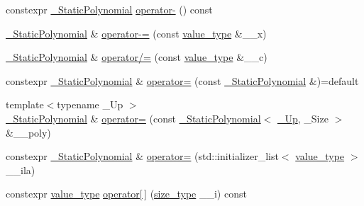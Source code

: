 \begin{DoxyCompactItemize}
\item 
constexpr \hyperlink{class____gnu__cxx_1_1__StaticPolynomial}{\+\_\+\+Static\+Polynomial} \hyperlink{class____gnu__cxx_1_1__StaticPolynomial_af5840c98a6a2a89c4e1220e03e68e6ba}{operator-\/} () const
\item 
\hyperlink{class____gnu__cxx_1_1__StaticPolynomial}{\+\_\+\+Static\+Polynomial} \& \hyperlink{class____gnu__cxx_1_1__StaticPolynomial_a8eef582763ba8d005a66d0ebc90a0312}{operator-\/=} (const \hyperlink{class____gnu__cxx_1_1__StaticPolynomial_aad5f3d6d5876b6926b30724aeac649d6}{value\+\_\+type} \&\+\_\+\+\_\+x)
\item 
\hyperlink{class____gnu__cxx_1_1__StaticPolynomial}{\+\_\+\+Static\+Polynomial} \& \hyperlink{class____gnu__cxx_1_1__StaticPolynomial_a33ab57b78b20dc2c752241c08109c360}{operator/=} (const \hyperlink{class____gnu__cxx_1_1__StaticPolynomial_aad5f3d6d5876b6926b30724aeac649d6}{value\+\_\+type} \&\+\_\+\+\_\+c)
\item 
constexpr \hyperlink{class____gnu__cxx_1_1__StaticPolynomial}{\+\_\+\+Static\+Polynomial} \& \hyperlink{class____gnu__cxx_1_1__StaticPolynomial_ae494f0196ebbf520a47153f3ba53a315}{operator=} (const \hyperlink{class____gnu__cxx_1_1__StaticPolynomial}{\+\_\+\+Static\+Polynomial} \&)=default
\item 
{\footnotesize template$<$typename \+\_\+\+Up $>$ }\\\hyperlink{class____gnu__cxx_1_1__StaticPolynomial}{\+\_\+\+Static\+Polynomial} \& \hyperlink{class____gnu__cxx_1_1__StaticPolynomial_a775ee2f930b16602e467282603f965c1}{operator=} (const \hyperlink{class____gnu__cxx_1_1__StaticPolynomial}{\+\_\+\+Static\+Polynomial}$<$ \hyperlink{namespace____gnu__cxx_ab693ea357b6429b331e0bf09f9442385}{\+\_\+\+Up}, \+\_\+\+Size $>$ \&\+\_\+\+\_\+poly)
\item 
constexpr \hyperlink{class____gnu__cxx_1_1__StaticPolynomial}{\+\_\+\+Static\+Polynomial} \& \hyperlink{class____gnu__cxx_1_1__StaticPolynomial_a63d81f13581a650d71ad6c2478dcbbcf}{operator=} (std\+::initializer\+\_\+list$<$ \hyperlink{class____gnu__cxx_1_1__StaticPolynomial_aad5f3d6d5876b6926b30724aeac649d6}{value\+\_\+type} $>$ \+\_\+\+\_\+ila)
\item 
constexpr \hyperlink{class____gnu__cxx_1_1__StaticPolynomial_aad5f3d6d5876b6926b30724aeac649d6}{value\+\_\+type} \hyperlink{class____gnu__cxx_1_1__StaticPolynomial_a2846303c230947a0cd31fdc0322c14c7}{operator\mbox{[}$\,$\mbox{]}} (\hyperlink{class____gnu__cxx_1_1__StaticPolynomial_a0cc0aa4adab35686ef2474e07f511ff9}{size\+\_\+type} \+\_\+\+\_\+i) const

\end{DoxyCompactItemize}

